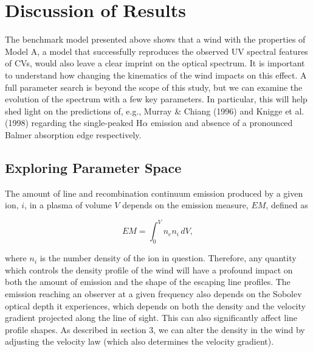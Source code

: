 \documentclass[preprint, a4paper, 11pt]{aastex}
\begin{document}



%
%

\section{Discussion of Results}

The benchmark model presented above shows that a wind with the properties
of Model A, a model that successfully reproduces the observed UV spectral features
of CVs,
would also leave a clear imprint on the optical spectrum. It is important
to understand how changing the kinematics of the wind impacts on this
effect. A full parameter search is beyond the scope of this study, 
but we can examine the evolution
of the spectrum with a few key parameters. In particular, this
will help shed light on the predictions of, e.g., Murray \& Chiang (1996)
and Knigge et al. (1998) regarding the single-peaked H$\alpha$ emission
and absence of a pronounced Balmer absorption edge respectively.

\subsection{Exploring Parameter Space}

The amount of line and recombination continuum
emission produced by a given ion, $i$, in a plasma of volume $V$
depends on the emission measure, $EM$, defined as

\begin{equation}
EM=\int^V_0 n_e n_i \,dV,
\end{equation}


where $n_i$ is the number density of the ion in question.    
Therefore, any quantity which controls the density profile of the wind
will have a profound impact on both the 
amount of emission and the shape of the escaping line profiles.
The emission reaching an observer at a given frequency
also depends on the Sobolev optical depth it experiences, which depends on both
the density and the velocity gradient projected
along the line of sight. This can also significantly affect line profile shapes.       
As described in section 3, we can alter the density in the wind by 
adjusting the velocity law (which also determines the velocity gradient). 
\end{document}
